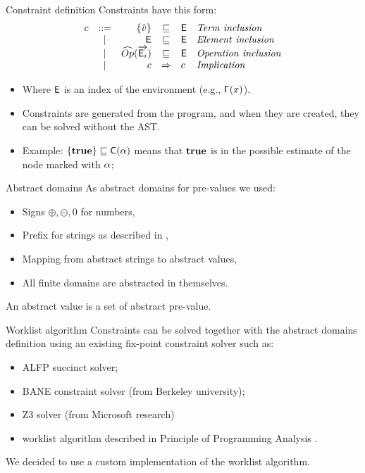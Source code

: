 \documentclass[11pt]{beamer}
\begin{document}
\begin{frame}{Constraint definition}
Constraints have this form:
\[
\begin{array}{lcrcll}
c & ::= &\{\vat\} & \sqsubseteq & \El & \mathit{Term\ inclusion}\\
& | & \El & \sqsubseteq & \El & \mathit{Element\ inclusion} \\
& | & \widehat{Op}(\vec{\El_i}) & \sqsubseteq & \El & \mathit{Operation\ inclusion}\\
& | & c & \Rightarrow & c & \mathit{Implication}\\
\end{array}
\]
\begin{itemize}
\item[] Where $\mathsf{E}$ is an index of the environment (e.g., $\mathsf{\Gamma}(x)$).
\item[] Constraints are generated from the program, and when they are created, they can be solved without the AST.
\item[] Example: $\{\mathbf{true}\}\sqsubseteq \mathsf{C}(\alpha)$ means that $\mathbf{true}$ is in the possible estimate of the node marked with $\alpha$;
\end{itemize}
\end{frame}


\begin{frame}{Abstract domains}
As abstract domains for pre-values we used:
\begin{itemize}
\item Signs $\oplus, \ominus, 0$ for numbers,
\item Prefix for strings as described in \cite{StringAbstraction},
\item Mapping from abstract strings to abstract values,
\item All finite domains are abstracted in themselves.
\end{itemize}
An abstract value is a set of abstract pre-value.
\end{frame}

\begin{frame}{Worklist algorithm}
Constraints can be solved together with the abstract domains definition using an existing fix-point constraint solver such as:
\begin{itemize}
\item ALFP succinct solver\cite{SuccinctSolver};
\item BANE constraint solver (from Berkeley university);
\item Z3 solver (from Microsoft research)
\item worklist algorithm described in Principle of Programming Analysis \cite{PrincipleProgramAnalysis}.
\end{itemize}

We decided to use a custom implementation of the worklist algorithm.
\end{frame}
\end{document}
